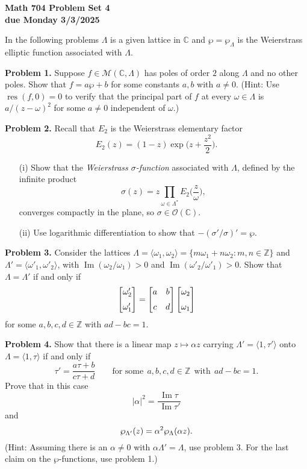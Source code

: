 \documentclass[12pt]{amsart}
\newcommand{\myim}{\operatorname{Im}}
\newcommand{\res}{\operatorname{res}}
\newcommand{\OO}{{\mathcal O}}
\newcommand{\MM}{{\mathcal M}}
\newcommand{\CC}{{\mathbb C}}
\newcommand{\ZZ}{{\mathbb Z}}
\newcommand{\vs}{\vspace{2mm}}
\begin{document}
\begin{center}
{\bf \large Math 704 Problem Set 4} \vs \\
{\bf due Monday 3/3/2025} \vs \vs
\end{center}
{\footnotesize In the following problems $\Lambda$ is a given lattice in $\CC$ and $\wp=\wp_{\Lambda}$ is the Weierstrass elliptic function associated with $\Lambda$.} \vs \vs

\noindent
{\bf Problem 1.} Suppose $f \in \MM(\CC, \Lambda)$ has poles of order $2$ along $\Lambda$ and no other poles. Show that $f= a \wp + b$ for some constants $a,b$ with $a \neq 0$. (Hint: Use $\res(f,0)=0$ to verify that the principal part of $f$ at every $\omega \in \Lambda$ is $a/(z-\omega)^2$ for some $a \neq 0$ independent of $\omega$.) \vs

\noindent
{\bf Problem 2.} Recall that $E_2$ is the Weierstrass elementary factor 
$$
E_2(z)=(1-z) \exp \Big( z + \frac{z^2}{2} \Big). 
$$
\begin{enumerate}
\item[(i)]
Show that the {\it Weierstrass $\sigma$-function} associated with $\Lambda$, defined by the infinite product 
$$
\sigma(z) = z \prod_{\omega \in \Lambda^\ast} E_2 \Big( \frac{z}{\omega}
\Big),
$$
converges compactly in the plane, so $\sigma \in \OO(\CC)$. \vs
\item[(ii)]
Use logarithmic differentiation to show that $-(\sigma'/\sigma)' = \wp$. \vs
\end{enumerate}

\noindent
{\bf Problem 3.} Consider the lattices $\Lambda=\langle \omega_1, \omega_2 \rangle = \{ m \omega_1+n \omega_2 : m,n \in \ZZ \}$ and $\Lambda'=\langle \omega'_1, \omega'_2 \rangle$, with $\myim(\omega_2/\omega_1)>0$ and $\myim(\omega'_2/\omega'_1)>0$. Show that $\Lambda=\Lambda'$ if and only if 
$$
\begin{bmatrix} \omega'_2 \vs \\ \omega'_1 \end{bmatrix} = \begin{bmatrix} a & b \vs \\ c & d \end{bmatrix} \begin{bmatrix} \omega_2 \vs \\ \omega_1 \end{bmatrix}
$$
for some $a,b,c,d \in \ZZ$ with $ad-bc=1$. \vs

\noindent
{\bf Problem 4.} Show that there is a linear map $z \mapsto \alpha z$ carrying $\Lambda'=\langle 1, \tau' \rangle$ onto $\Lambda =\langle 1, \tau \rangle$ if and only if  
$$
\tau' = \frac{a\tau+b}{c\tau+d} \qquad \text{for some} \ \ a,b,c,d \in \ZZ \ \ \text{with} \ \ ad-bc=1. 
$$
Prove that in this case
$$
|\alpha|^2 = \frac{\myim{\tau}}{\ \myim{\tau'}}
$$
and
$$
\wp_{\Lambda'}(z) = \alpha^2 \wp_{\Lambda}(\alpha z). \vs
$$
(Hint: Assuming there is an $\alpha \neq 0$ with $\alpha \Lambda'=\Lambda$, use problem 3. For the last claim on the $\wp$-functions, use problem 1.) \vs 
\end{document}
